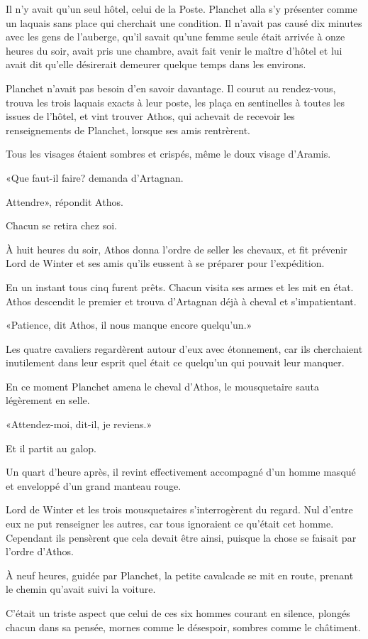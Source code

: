 Il n'y avait qu'un seul hôtel, celui de la Poste. Planchet alla s'y présenter comme un laquais sans place qui cherchait une condition. Il n'avait pas causé dix minutes avec les gens de l'auberge, qu'il savait qu'une femme seule était arrivée à onze heures du soir, avait pris une chambre, avait fait venir le maître d'hôtel et lui avait dit qu'elle désirerait demeurer quelque temps dans les environs. 

Planchet n'avait pas besoin d'en savoir davantage. Il courut au rendez-vous, trouva les trois laquais exacts à leur poste, les plaça en sentinelles à toutes les issues de l'hôtel, et vint trouver Athos, qui achevait de recevoir les renseignements de Planchet, lorsque ses amis rentrèrent. 

Tous les visages étaient sombres et crispés, même le doux visage d'Aramis. 

«Que faut-il faire? demanda d'Artagnan. 

\speak  Attendre», répondit Athos. 

Chacun se retira chez soi. 

À huit heures du soir, Athos donna l'ordre de seller les chevaux, et fit prévenir Lord de Winter et ses amis qu'ils eussent à se préparer pour l'expédition. 

En un instant tous cinq furent prêts. Chacun visita ses armes et les mit en état. Athos descendit le premier et trouva d'Artagnan déjà à cheval et s'impatientant. 

«Patience, dit Athos, il nous manque encore quelqu'un.» 

Les quatre cavaliers regardèrent autour d'eux avec étonnement, car ils cherchaient inutilement dans leur esprit quel était ce quelqu'un qui pouvait leur manquer. 

En ce moment Planchet amena le cheval d'Athos, le mousquetaire sauta légèrement en selle. 

«Attendez-moi, dit-il, je reviens.» 

Et il partit au galop. 

Un quart d'heure après, il revint effectivement accompagné d'un homme masqué et enveloppé d'un grand manteau rouge. 

Lord de Winter et les trois mousquetaires s'interrogèrent du regard. Nul d'entre eux ne put renseigner les autres, car tous ignoraient ce qu'était cet homme. Cependant ils pensèrent que cela devait être ainsi, puisque la chose se faisait par l'ordre d'Athos. 

À neuf heures, guidée par Planchet, la petite cavalcade se mit en route, prenant le chemin qu'avait suivi la voiture. 

C'était un triste aspect que celui de ces six hommes courant en silence, plongés chacun dans sa pensée, mornes comme le désespoir, sombres comme le châtiment.